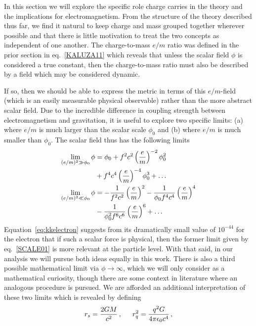 In this section we will explore the specific role charge carries in the theory and the implications for electromagnetism. From the structure of the theory described thus far, we find it natural to keep charge and mass grouped together wherever possible and that there is little motivation to treat the two concepts as independent of one another. The charge-to-mass $e/m$ ratio was defined in the prior section in eq.~\eqref{KALUZA11} which reveals that unless the scalar field $\phi$ is considered a true constant, then the charge-to-mass ratio must also be described by a field which may be considered dynamic. 

If so, then we should be able to express the metric in terms of this $e/m$-field (which is an easily measurable physical observable) rather than the more abstract scalar field. Due to the incredible difference in coupling strength between electromagnetism and gravitation, it is useful to explore two specific limits: (a) where $e/m$ is much larger than the scalar scale $\phi_{0}$ and (b) where $e/m$ is much smaller than $\phi_{0}$. The scalar field thus has the following limits
\begin{alignat}{1}
	\notag\lim_{(\text{{\scriptsize{$e/m$}}})^{2}\gg\phi_{0}}\phi&=\phi_{0}+f^{2}c^{2}\left(\frac{e}{m}\right)^{-2}\phi_{0}^{2}\\
	\label{SCALE01}&+f^{4}c^{4}\left(\frac{e}{m}\right)^{-4}\phi_{0}^{3}+\ldots\\
	\notag\lim_{(\text{{\scriptsize{$e/m$}}})^{2}\ll\phi_{0}}\phi&=-\frac{1}{f^{2}c^{2}}\left(\frac{e}{m}\right)^{2}-\frac{1}{\phi_{0}f^{4}c^{4}}\left(\frac{e}{m}\right)^{4}\\
	\label{SCALE02}&-\frac{1}{\phi_{0}^{2}f^{6}c^{6}}\left(\frac{e}{m}\right)^{6}+\ldots
\end{alignat}
Equation~\eqref{eq:kkelectron} suggests from its dramatically small value of $10^{-44}$ for the electron that if such a scalar force is physical, then the former limit given by eq.~\eqref{SCALE01} is more relevant at the particle level. With that said, in our analysis we will pursue both ideas equally in this work. There is also a third possible mathematical limit via $\phi\rightarrow\infty$, which we will only consider as a mathematical curiosity, though there are some context in literature where an analogous procedure is pursued. We are afforded an additional interpretation of these two limits which is revealed by defining
\begin{alignat}{1}
	\label{eq:ScaleRadius}r_{s}=\frac{2GM}{c^{2}}\,,\indent r_{q}^{2}=\frac{q^{2}G}{4\pi\epsilon_{0}c^{4}}\,,
\end{alignat}
